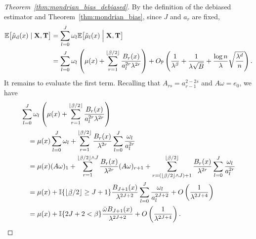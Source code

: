 \begin{proof}[Theorem~\ref{thm:mondrian_bias_debiased}]

  By the definition of the debiased estimator and
  Theorem~\ref{thm:mondrian_bias}, since $J$ and $a_r$ are fixed,
  \begin{align*}
    \E \big[ \hat \mu_\rd(x) \mid \bX, \bT \big]
    &=
    \sum_{l=0}^J
    \omega_l
    \E \big[
      \hat \mu_l(x)
      \Bigm| \bX, \bT
    \big] \\
    &=
    \sum_{l=0}^J
    \omega_l
    \left(
      \mu(x)
      + \sum_{r=1}^{\lfloor \flbeta / 2 \rfloor}
      \frac{B_r(x)}{a_l^{2r} \lambda^{2r}}
    \right)
    + O_\P \left(
      \frac{1}{\lambda^\beta}
      + \frac{1}{\lambda \sqrt B}
      + \frac{\log n}{\lambda} \sqrt{\frac{\lambda^d}{n}}
    \right).
  \end{align*}
  It remains to evaluate the first term.
  Recalling that $A_{r s} = a_{r-1}^{2 - 2s}$
  and $A \omega = e_0$, we have
  \begin{align*}
    &\sum_{l=0}^J
    \omega_l
    \left(
      \mu(x)
      + \sum_{r=1}^{\lfloor \flbeta / 2 \rfloor}
      \frac{B_r(x)}{a_l^{2r} \lambda^{2r}}
    \right) \\
    &\quad=
    \mu(x)
    \sum_{l=0}^J
    \omega_l
    +
    \sum_{r=1}^{\lfloor \flbeta / 2 \rfloor}
    \frac{B_r(x)}{\lambda^{2r}}
    \sum_{l=0}^J
    \frac{\omega_l}{a_l^{2r}} \\
    &\quad=
    \mu(x)
    (A \omega)_1
    + \sum_{r=1}^{\lfloor \flbeta / 2 \rfloor \wedge J}
    \frac{B_r(x)}{\lambda^{2r}}
    (A \omega)_{r+1}
    + \sum_{r = (\lfloor \flbeta / 2 \rfloor \wedge J) + 1}
    ^{\lfloor \flbeta / 2 \rfloor}
    \frac{B_r(x)}{\lambda^{2r}}
    \sum_{l=0}^J
    \frac{\omega_l}{a_l^{2r}} \\
    &\quad=
    \mu(x)
    + \I\{\lfloor \flbeta / 2 \rfloor \geq J + 1\}
    \frac{B_{J+1}(x)}{\lambda^{2J + 2}}
    \sum_{l=0}^J
    \frac{\omega_l}{a_l^{2J + 2}}
    + O \left( \frac{1}{\lambda^{2J + 4}} \right) \\
    &\quad=
    \mu(x)
    + \I\{2J + 2 < \beta\}
    \frac{\bar\omega B_{J+1}(x)}{\lambda^{2J + 2}}
    + O \left( \frac{1}{\lambda^{2J + 4}} \right).
  \end{align*}
\end{proof}

